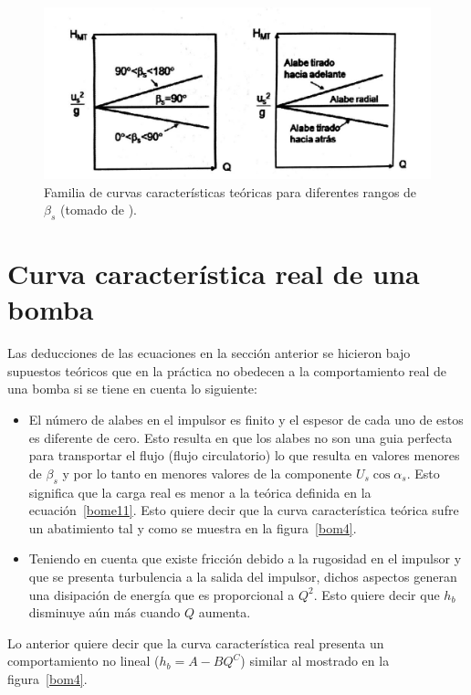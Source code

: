 \documentclass[11pt, oneside]{article}
\begin{document}
\begin{figure}[h]
\centering
\includegraphics[width=12cm]{./figs/bom3.jpeg}
\caption{Familia de curvas caracter\'isticas te\'oricas para diferentes rangos de $\beta_s$ (tomado de \cite{agudelo2011mecanica}).} 
\label{bom3}
\end{figure}

\section{Curva caracter\'istica real de una bomba}
Las deducciones de las ecuaciones en la secci\'on anterior se hicieron bajo supuestos te\'oricos que en la pr\'actica no obedecen a la comportamiento real de una bomba si se tiene en cuenta lo siguiente:
\begin{itemize} 
\item El n\'umero de alabes en el impulsor es finito y el espesor de cada uno de estos es diferente de cero. Esto resulta en que los alabes no son una guia perfecta para transportar el flujo (flujo circulatorio) lo que resulta en valores menores de $\beta_s$ y por lo tanto en menores valores de la componente $U_s \cos \alpha_s$. Esto significa que la carga real es menor a la te\'orica definida en la ecuaci\'on~\ref{bome11}. Esto quiere decir que la curva caracter\'istica te\'orica sufre un abatimiento tal y como se muestra en la figura~\ref{bom4}.
\item Teniendo en cuenta que existe fricci\'on debido a la rugosidad en el impulsor y que se presenta turbulencia a la salida del impulsor, dichos aspectos generan una disipaci\'on de energ\'ia que es proporcional a $Q^2$. Esto quiere decir que $h_b$ disminuye a\'un m\'as cuando $Q$ aumenta. 
\end{itemize} 
Lo anterior quiere decir que la curva caracter\'istica real presenta un comportamiento no lineal ($h_b= A-B Q^C$) similar al mostrado en la figura~\ref{bom4}.
\end{document}
